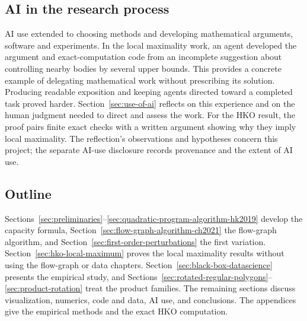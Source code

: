 \subsection{AI in the research process}

AI use extended to choosing methods and developing mathematical arguments,
software and experiments. In the local maximality work, an agent developed
the argument and exact-computation code from an incomplete suggestion about
controlling nearby bodies by several upper bounds. This provides a
concrete example of delegating mathematical work without prescribing its
solution. Producing readable exposition and keeping agents directed toward
a completed task proved harder. Section~\ref{sec:use-of-ai} reflects on
this experience and on the human judgment needed to direct and assess the
work. For the HKO result, the proof pairs finite exact checks with a
written argument showing why they imply local maximality. The reflection's
observations and hypotheses concern this project; the separate
AI-use disclosure records provenance and the extent of AI use.

\subsection*{Outline}

Sections~\ref{sec:preliminaries}--\ref{sec:quadratic-program-algorithm-hk2019}
develop the capacity formula, Section~\ref{sec:flow-graph-algorithm-ch2021}
the flow-graph algorithm, and Section~\ref{sec:first-order-perturbations}
the first variation. Section~\ref{sec:hko-local-maximum} proves the local
maximality results without using the flow-graph or data chapters.
Section~\ref{sec:black-box-datascience} presents the empirical study, and
Sections~\ref{sec:rotated-regular-polygons}--\ref{sec:product-rotation}
treat the product families. The remaining sections discuss visualization,
numerics, code and data, AI use, and conclusions. The appendices give
the empirical methods and the exact HKO computation.
